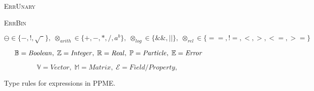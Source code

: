 \begin{figure}[t]
\begin{center}
\begin{prooftree}
      \end{prooftree}
    \end{center}
    \begin{center}
      \textsc{ErrUnary}
      \begin{prooftree}
      \end{prooftree}
      \qquad
      \textsc{ErrBin}
      \begin{prooftree}
      \end{prooftree}%
    \end{center}%
    \begin{center}%
      \begin{tcolorbox}[enhanced,colback=white,left=0pt,right=0pt,top=0pt,boxsep=0pt,boxrule=0pt,toprule=1pt,colframe=white!60!black,rightrule=1pt,arc=0pt,outer arc=0pt,leftrule=1pt,bottomrule=1pt,width=.95\textwidth,after skip=0pt,before skip=0pt]
      \footnotesize
        \begin{minipage}{\textwidth}
         \begin{equation*}
           \ominus         \in \{-, !, \sqrt{\phantom{e}}\},\;
           \otimes_{arith} \in \{ +, -, *, /, a^b \},\;
           \otimes_{log}   \in \{ \&\&, || \},\;
           \otimes_{rel}   \in \{ ==, !=, <, >, <=, >= \}
         \end{equation*}
        \end{minipage}
        \begin{minipage}{\textwidth}
          \begin{equation*}
            \revii{\mathbb{B} = \mathit{Boolean}},\;
            \mathbb{Z} = \mathit{Integer},\;
            \mathbb{R} = \mathit{Real},\;
            \mathbb{P} = \mathit{Particle},\;
            \mathbb{E} = \mathit{Error}
          \end{equation*}
        \end{minipage}
        \begin{minipage}{\textwidth}
          \begin{equation*}
            \mathbb{V} = \mathit{Vector},\;
            \mathbb{M} = \mathit{Matrix},\;
            \mathcal{E} = \mathit{Field/Property},\;
          \end{equation*}%
        \end{minipage}%
      \end{tcolorbox}%
    \end{center}%
    \caption{Type rules for expressions in PPME.}%
    \label{fig:type_rules}%
  \end{figure}%

